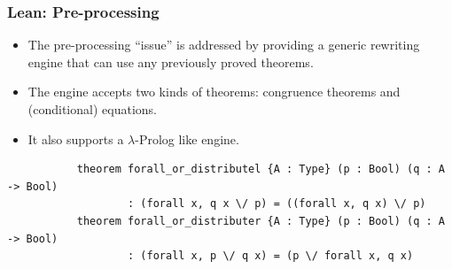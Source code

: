 \documentclass[svgnames,table,mathserif]{beamer}
\begin{document}
\begin{frame}[fragile]
\frametitle{Lean: Pre-processing}
  \begin{itemize}
     \item The pre-processing ``issue'' is addressed by providing a {\color{red} generic rewriting
engine} that can use any previously proved theorems.
     \item The engine accepts two kinds of theorems: {\color{red} congruence theorems} and {\color{red} (conditional)
equations}.
     \item It also supports a $\lambda$-Prolog like engine.
  \end{itemize}

{\tiny
\begin{verbatim}
           theorem forall_or_distributel {A : Type} (p : Bool) (q : A -> Bool)
                   : (forall x, q x \/ p) = ((forall x, q x) \/ p)
           theorem forall_or_distributer {A : Type} (p : Bool) (q : A -> Bool)
                   : (forall x, p \/ q x) = (p \/ forall x, q x)
\end{verbatim}
}

\end{frame}
\end{document}
